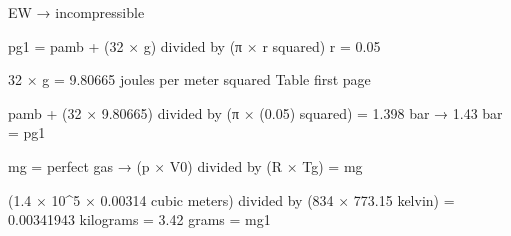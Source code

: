 EW → incompressible  

pg1 = pamb + (32 × g) divided by (π × r squared)  
r = 0.05  

32 × g = 9.80665 joules per meter squared  
Table first page  

pamb + (32 × 9.80665) divided by (π × (0.05) squared) = 1.398 bar → 1.43 bar = pg1  

mg = perfect gas → (p × V0) divided by (R × Tg) = mg  

(1.4 × 10^5 × 0.00314 cubic meters) divided by (834 × 773.15 kelvin) = 0.00341943 kilograms = 3.42 grams = mg1